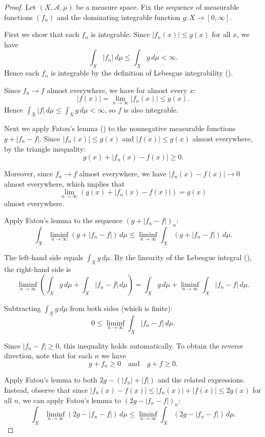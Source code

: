 \begin{proof}
    Let $(X, \mathcal{A}, \mu)$ be a measure space. Fix the sequence of measurable functions $(f_n)$ and the dominating integrable function $g : X \to [0,\infty]$.

    First we show that each $f_n$ is integrable. Since $|f_n(x)| \leq g(x)$ for all $x$, we have
    $$\int_X |f_n|\,d\mu \leq \int_X g\,d\mu < \infty.$$
    Hence each $f_n$ is integrable by the definition of Lebesgue integrability ().

    Since $f_n \to f$ almost everywhere, we have for almost every $x$:
    $$|f(x)| = \lim_{n \to \infty} |f_n(x)| \leq g(x).$$
    Hence $\int_X |f|\,d\mu \leq \int_X g\,d\mu < \infty$, so $f$ is also integrable.

    Next we apply Fatou's lemma () to the nonnegative measurable functions $g + |f_n - f|$. Since $|f_n(x)| \leq g(x)$ and $|f(x)| \leq g(x)$ almost everywhere, by the triangle inequality:
    $$g(x) + |f_n(x) - f(x)| \geq 0.$$

    Moreover, since $f_n \to f$ almost everywhere, we have $|f_n(x) - f(x)| \to 0$ almost everywhere, which implies that
    $$\lim_{n \to \infty} (g(x) + |f_n(x) - f(x)|) = g(x)$$
    almost everywhere.

    Apply Fatou's lemma to the sequence $(g + |f_n - f|)_n$:
    $$\int_X \liminf_{n \to \infty} (g + |f_n - f|)\,d\mu \leq \liminf_{n \to \infty} \int_X (g + |f_n - f|)\,d\mu.$$

    The left-hand side equals $\int_X g\,d\mu$. By the linearity of the Lebesgue integral (), the right-hand side is
    $$\liminf_{n \to \infty} \left(\int_X g\,d\mu + \int_X |f_n - f|\,d\mu\right) = \int_X g\,d\mu + \liminf_{n \to \infty} \int_X |f_n - f|\,d\mu.$$

    Subtracting $\int_X g\,d\mu$ from both sides (which is finite):
    $$0 \leq \liminf_{n \to \infty} \int_X |f_n - f|\,d\mu.$$

    Since $|f_n - f| \geq 0$, this inequality holds automatically. To obtain the reverse direction, note that for each $n$ we have
    $$g + f_n \geq 0 \quad \text{and} \quad g + f \geq 0.$$

    Apply Fatou's lemma to both $2g - (|f_n| + |f|)$ and the related expressions. Instead, observe that since $|f_n(x) - f(x)| \leq |f_n(x)| + |f(x)| \leq 2g(x)$ for all $n$, we can apply Fatou's lemma to $(2g - |f_n - f|)_n$:
    $$\int_X \liminf_{n \to \infty} (2g - |f_n - f|)\,d\mu \leq \liminf_{n \to \infty} \int_X (2g - |f_n - f|)\,d\mu.$$


\end{proof}
